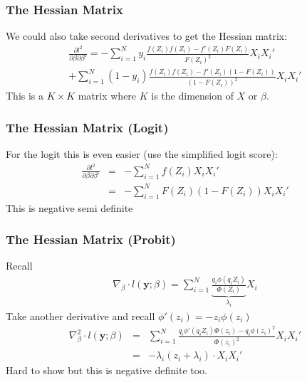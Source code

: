\documentclass[aspectratio=169]{beamer}
\begin{document}
\begin{frame}
\frametitle{The Hessian Matrix}
We could also take second derivatives to get the \alert{Hessian} matrix:
\begin{eqnarray*}
\frac{\partial l^2 }{\partial \beta \partial \beta'} = - \sum_{i=1}^N   y_i \frac{ f(Z_i)  f(Z_i) - f'(Z_i) F(Z_i) }{ F(Z_i)^2}  X_i X_i' \\
+  \sum_{i=1}^N   (1-y_i) \frac{f(Z_i)f(Z_i) - f'(Z_i)(1-F(Z_i))}{(1-F(Z_i))^2}  X_i X_i'
\end{eqnarray*}
This is a $K\times K$ matrix where $K$ is the dimension of $X$ or $\beta$.
\end{frame}



\begin{frame}
\frametitle{The Hessian Matrix (Logit)}
For the logit this is even easier (use the simplified logit score):
\begin{eqnarray*}
\frac{\partial l^2 }{\partial \beta \partial \beta'}  &=& - \sum_{i=1}^N f(Z_i) X_i X_i' \\
&=& - \sum_{i=1}^N F(Z_i) (1- F(Z_i)) X_i X_i'
\end{eqnarray*}
This is \alert{negative semi definite}
\end{frame}

\begin{frame}
\frametitle{The Hessian Matrix (Probit)}
Recall
\begin{eqnarray*}
\nabla_{\beta} \cdot l(\mathbf{y}; \beta)= \sum_{i=1}^N \underbrace{\frac{ q_i \phi(q_i Z_i)}{\Phi(Z_i)}}_{\lambda_i} X_i
\end{eqnarray*}
Take another derivative and recall $\phi'(z_i) = - z_i \phi(z_i)$
\begin{eqnarray*}
\nabla_{\beta}^2 \cdot l(\mathbf{y}; \beta)&=& \sum_{i=1}^N \frac{q_i \phi'(q_i Z_i) \Phi(z_i) - q_i \phi(z_i)^2}{\Phi(z_i)^2}  X_i X_i' \\
&=& - \lambda_i( z_i + \lambda_i) \cdot X_i X_i'
\end{eqnarray*}
Hard to show but this is \alert{negative definite} too.
\end{frame}
\end{document}
